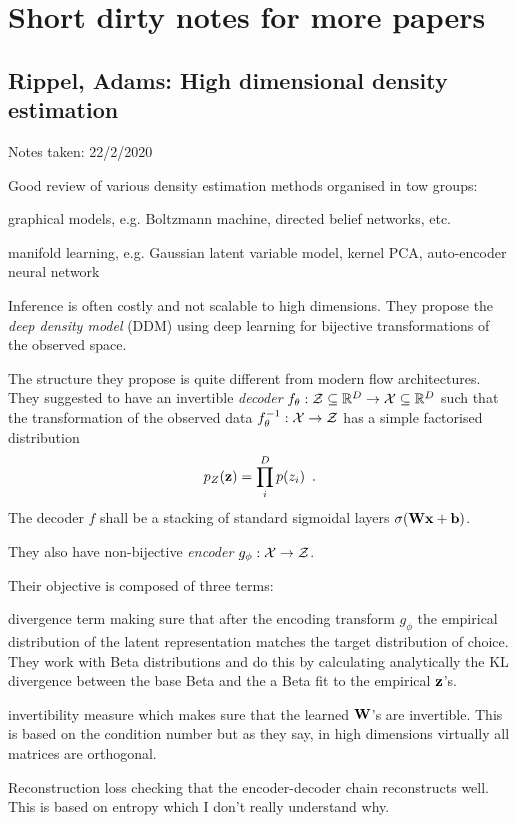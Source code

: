\clearpage

\section{Short dirty notes for more papers}


\subsection{Rippel, Adams: High dimensional density estimation}

\begin{notebox}

\hfill Notes taken: 22/2/2020 
\end{notebox}

Good review of various density estimation methods organised in tow groups:
\begin{compactitem}
\item graphical models, e.g. Boltzmann machine, directed belief networks, etc.
\item manifold learning, e.g. Gaussian latent variable model, kernel PCA, auto-encoder neural network
\end{compactitem}
Inference is often costly and not scalable to high dimensions.
They propose the \emph{deep density model} (DDM) using deep learning for bijective transformations of the observed space.

The structure they propose is quite different from modern flow architectures.
They suggested to have an invertible \emph{decoder} $f_\theta : \mathcal{Z} \subseteq \mathbb{R}^D \to \mathcal{X} \subseteq \mathbb{R}^D$ such that the transformation of the observed data $f_\theta^{-1} : \mathcal{X} \to \mathcal{Z}$ has a simple factorised distribution 
\begin{equation}
p_Z(\mathbf{z}) = \prod_i^D p(z_i) \enspace .
\end{equation}
The decoder $f$ shall be a stacking of standard sigmoidal layers $\sigma(\mathbf{W} \mathbf{x} + \mathbf{b})$.

They also have non-bijective \emph{encoder} $g_\phi : \mathcal{X} \to \mathcal{Z}$.

Their objective is composed of three terms:
\begin{compactitem}
\item divergence term making sure that after the encoding transform $g_\phi$ the empirical distribution of the latent representation matches the target distribution of choice. They work with Beta distributions and do this by calculating analytically the KL divergence between the base Beta and the a Beta fit to the empirical $\mathbf{z}$'s. 
\item invertibility measure which makes sure that the learned $\mathbf{W}$'s are invertible. This is based on the condition number but as they say, in high dimensions virtually all matrices are orthogonal.
\item Reconstruction loss checking that the encoder-decoder chain reconstructs well. This is based on entropy which I don't really understand why.
\end{compactitem}

